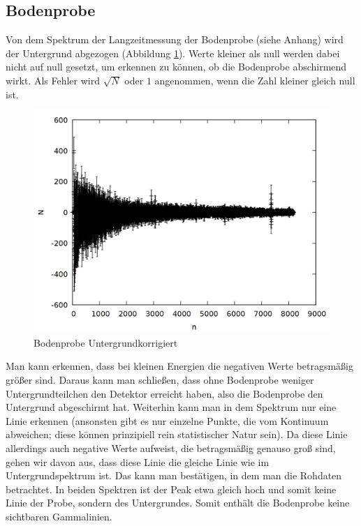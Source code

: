 \newpage

\subsection{Bodenprobe}
Von dem Spektrum der Langzeitmessung der Bodenprobe (siehe Anhang) wird der Untergrund abgezogen (Abbildung \ref{fig:erde}). Werte kleiner als null werden dabei nicht auf null gesetzt, um erkennen zu können, ob die Bodenprobe abschirmend wirkt. Als Fehler wird $\sqrt{N}$ oder $1$ angenommen, wenn die Zahl kleiner gleich null ist.

\begin{figure}[!h]
\centering
\includegraphics[width=0.7\linewidth]{data/erde.png}
\caption{Bodenprobe Untergrundkorrigiert}
\label{fig:erde}
\end{figure}

Man kann erkennen, dass bei kleinen Energien die negativen Werte betragsmäßig größer sind. Daraus kann man schließen, dass ohne Bodenprobe weniger Untergrundteilchen den Detektor erreicht haben, also die Bodenprobe den Untergrund abgeschirmt hat. Weiterhin kann man in dem Spektrum nur eine Linie erkennen (ansonsten gibt es nur einzelne Punkte, die vom Kontinuum abweichen; diese können prinzipiell rein statistischer Natur sein). Da diese Linie allerdings auch negative Werte aufweist, die betragsmäßig genauso groß sind, gehen wir davon aus, dass diese Linie die gleiche Linie wie im Untergrundspektrum ist. Das kann man bestätigen, in dem man die Rohdaten betrachtet. In beiden Spektren ist der Peak etwa gleich hoch und somit keine Linie der Probe, sondern des Untergrundes. Somit enthält die Bodenprobe keine sichtbaren Gammalinien.\\

